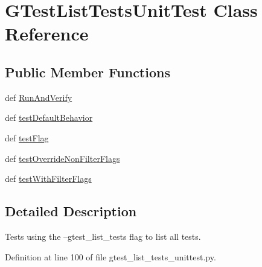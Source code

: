 \hypertarget{classgtest__list__tests__unittest_1_1GTestListTestsUnitTest}{\section{\-G\-Test\-List\-Tests\-Unit\-Test \-Class \-Reference}
\label{de/d42/classgtest__list__tests__unittest_1_1GTestListTestsUnitTest}
}
\subsection*{\-Public \-Member \-Functions}
\begin{DoxyCompactItemize}
\item 
def \hyperlink{classgtest__list__tests__unittest_1_1GTestListTestsUnitTest_adc02f4ab231c886fc73ece7b7ee533c1}{\-Run\-And\-Verify}
\item 
def \hyperlink{classgtest__list__tests__unittest_1_1GTestListTestsUnitTest_a9da84d75ab4797f2c3730d5974ed3823}{test\-Default\-Behavior}
\item 
def \hyperlink{classgtest__list__tests__unittest_1_1GTestListTestsUnitTest_a02b1b74bbc5e2eecc6d6c4117de89a81}{test\-Flag}
\item 
def \hyperlink{classgtest__list__tests__unittest_1_1GTestListTestsUnitTest_a2abeb8773ea7c2af06429a8ee4a234cb}{test\-Override\-Non\-Filter\-Flags}
\item 
def \hyperlink{classgtest__list__tests__unittest_1_1GTestListTestsUnitTest_a26c1b847d7d1abbd3812634a28315779}{test\-With\-Filter\-Flags}
\end{DoxyCompactItemize}


\subsection{\-Detailed \-Description}
\begin{DoxyVerb}Tests using the --gtest_list_tests flag to list all tests.\end{DoxyVerb}
 

\-Definition at line 100 of file gtest\-\_\-list\-\_\-tests\-\_\-unittest.\-py.




